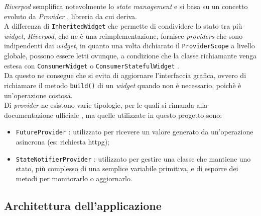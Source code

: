 \emph{Riverpod} semplifica notevolmente lo \emph{state management} e si basa su un concetto evoluto da \emph{Provider} \cite{site:provider}, libreria da cui deriva.\\
A differenza di \lstinline{InheritedWidget} \cite{site:inheritw} che permette di condividere lo stato tra più \emph{widget}, \emph{Riverpod}, che ne è una reimplementazione, fornisce \emph{providers} che sono indipendenti dai \emph{widget}, in quanto una volta dichiarato il \lstinline{ProviderScope} a livello globale, possono essere letti ovunque, a condizione che la classe richiamante venga estesa con \lstinline{ConsumerWidget} o \lstinline{ConsumerStatefulWidget} \cite{site:reading-provider}. \\
Da questo ne consegue che si evita di aggiornare l'interfaccia grafica, ovvero di richiamare il metodo \lstinline{build()} di un \emph{widget} quando non è necessario, poichè è un'operazione costosa.\\
Di \emph{provider} ne esistono varie tipologie, per le quali si rimanda alla documentazione ufficiale \cite{site:riverpod}, ma quelle utilizzate in questo progetto sono:
\begin{itemize}
    \item \lstinline{FutureProvider} \cite{site:future-provider}: utilizzato per ricevere un valore generato da un'operazione asincrona (es: richiesta \gls{httpg}\glsoccur);
    \item \lstinline{StateNotifierProvider} \cite{site:state-notifier-provider}: utilizzato per gestire una classe che mantiene uno stato, più complesso di una semplice variabile primitiva, e di esporre dei metodi per monitorarlo o aggiornarlo.
\end{itemize}

\subsection{Architettura dell'applicazione}
\label{subsec:architettura-app}


